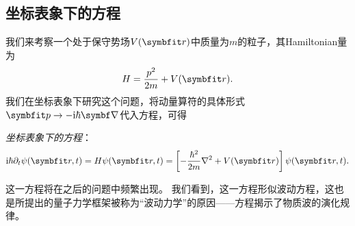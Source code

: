 \subsection{坐标表象下的\schrodinger 方程}
\label{subsec:cmr_schrodinger}

我们来考察一个处于保守势场$V(\rr)$中质量为$m$的粒子，其Hamiltonian量为
\begin{equation}
    H = \frac{p^2}{2m} + V(\rr).
\end{equation}
我们在坐标表象下研究这个问题，将动量算符的具体形式$\pp\rightarrow -\ii\hbar\del$代入\schrodinger 方程，可得
\begin{tcolorbox}
\emph{坐标表象下的\schrodinger 方程}：
\begin{equation}
    \ii\hbar\pd_t \psi(\rr,t) = H\psi(\rr,t) = \left[-\frac{\hbar^2}{2m}\nabla^2 + V(\rr)\right]\psi(\rr,t).
\end{equation}
\end{tcolorbox}
这一方程将在之后的问题中频繁出现。
我们看到，这一方程形似波动方程，这也是\schrodinger 所提出的量子力学框架被称为“波动力学”的原因——\schrodinger 方程揭示了物质波的演化规律。

